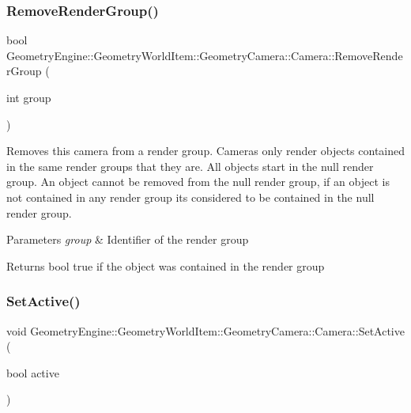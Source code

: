 \subsubsection{\texorpdfstring{RemoveRenderGroup()}{RemoveRenderGroup()}}
{\footnotesize\ttfamily bool Geometry\+Engine\+::\+Geometry\+World\+Item\+::\+Geometry\+Camera\+::\+Camera\+::\+Remove\+Render\+Group (\begin{DoxyParamCaption}\item[{int}]{group }\end{DoxyParamCaption})\hspace{0.3cm}{\ttfamily [virtual]}}

Removes this camera from a render group. Cameras only render objects contained in the same render groups that they are. All objects start in the null render group. An object cannot be removed from the null render group, if an object is not contained in any render group it\textquotesingle{}s considered to be contained in the null render group. 
\begin{DoxyParams}{Parameters}
{\em group} & Identifier of the render group \\
\hline
\end{DoxyParams}
\begin{DoxyReturn}{Returns}
bool true if the object was contained in the render group 
\end{DoxyReturn}
\mbox{\label{class_geometry_engine_1_1_geometry_world_item_1_1_geometry_camera_1_1_camera_a49c09449ffef91d95dea44061b3b4c21}} 
\subsubsection{\texorpdfstring{SetActive()}{SetActive()}}
{\footnotesize\ttfamily void Geometry\+Engine\+::\+Geometry\+World\+Item\+::\+Geometry\+Camera\+::\+Camera\+::\+Set\+Active (\begin{DoxyParamCaption}\item[{bool}]{active }\end{DoxyParamCaption})\hspace{0.3cm}{\ttfamily [inline]}}

